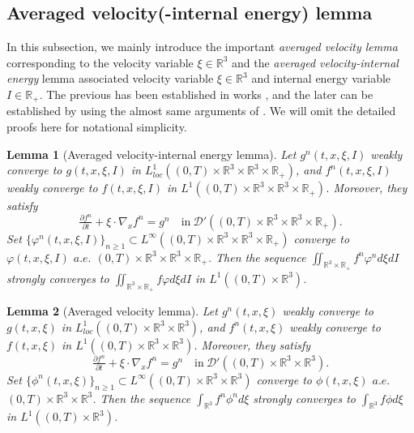 \documentclass[reqno,11pt]{amsart}
\newtheorem{lemma}{Lemma}[section]
\numberwithin{equation}{section}
\def\R{\mathbb{R}}
\begin{document}
\subsection{Averaged velocity(-internal energy) lemma}

In this subsection, we mainly introduce the important {\em averaged velocity lemma} corresponding to the velocity variable $\xi \in \R^3 $ and the {\em averaged velocity-internal energy} lemma associated velocity variable $\xi \in  \R^3$ and internal energy variable $I \in \R_+$. The previous has been established in works \cite{Diperna-Lions,Golse-velocity,Golse-perthame-velocity}, and the later can be established by using the almost same arguments of \cite{Diperna-Lions,Golse-velocity,Golse-perthame-velocity}. We will omit the detailed proofs here for notational simplicity.

\begin{lemma}[Averaged velocity-internal energy lemma]\label{theo-6.2}
Let $g^n (t,x, \xi, I)$ weakly converge to $g (t,x, \xi, I)$ in $ L^1_{loc} ((0,T)\times \R^3 \times \R^3 \times \R_+) $, and $f^n (t,x, \xi, I)$ weakly converge to $f (t, x, \xi, I)$ in $L^1 ( (0,T)\times \R^3 \times \R^3 \times \R_+ )$. Moreover, they satisfy
	\begin{equation*}
		\tfrac{\partial f^n}{\partial t} +\xi \cdot \nabla_x f^n = g^n \quad \text{in}\ \mathscr{D}' ((0,T) \times \R^3 \times \R^3 \times \R_+) .
	\end{equation*}
Set $\{\varphi^n (t, x, \xi, I) \}_{n\geq 1} \subset L^\infty ((0,T)\times \R^3 \times \R^3 \times \R_+)$ converge to $\varphi (t, x, \xi, I)$ $a.e.$ $(0,T)\times \R^3 \times \R^3 \times \R_+$. Then the sequence $\iint_{\R^3\times \R_+} f^n\varphi^n d\xi dI$ strongly converges to $\iint_{\R^3\times \R_+} f \varphi d\xi dI$ in $L^1((0,T)\times \R^3)$.
\end{lemma}


\begin{lemma}[Averaged velocity lemma]\label{theo-6.2.1}
Let $g^n (t,x, \xi)$ weakly converge to $g (t, x, \xi)$ in $L^1_{loc} ( (0,T) \times \R^3 \times \R^3 )$, and $ f^n (t, x, \xi) $ weakly converge to $f (t, x, \xi)$ in $L^1 ( (0,T) \times \R^3 \times \R^3 )$. Moreover, they satisfy
	\begin{equation*}
		\tfrac{\partial f^n}{\partial t} +\xi \cdot \nabla_x f^n = g^n \quad \text{in}\ \mathscr{D}' ((0,T) \times \R^3 \times \R^3 ) .
	\end{equation*}
Set $\{\phi^n (t,x, \xi)\}_{n\geq 1} \subset L^\infty ((0,T)\times \R^3 \times \R^3 )$ converge to $ \phi (t, x, \xi) $ $a. e.$ $(0,T) \times \R^3 \times \R^3$. Then the sequence $\int_{\R^3} f^n\phi^n d\xi $ strongly converges to $ \int_{\R^3 } f \phi d\xi $ in $L^1((0,T)\times \R^3)$.
\end{lemma}
\end{document}
